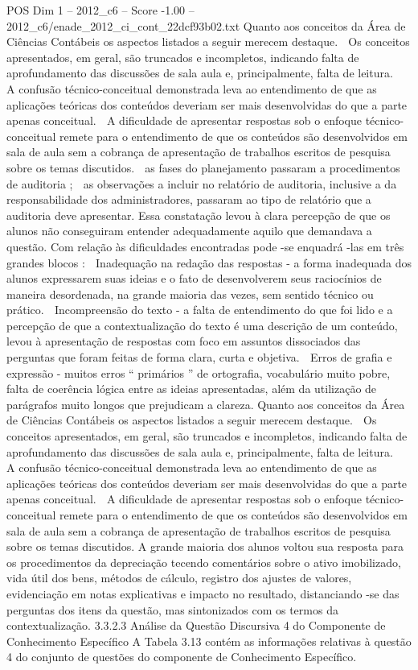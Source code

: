 \begin{textsample}{POS Dim 1 – 2012\_c6 – Score -1.00 – 2012\_c6/enade\_2012\_ci\_cont\_22dcf93b02.txt}
Quanto aos conceitos da Área de Ciências Contábeis os aspectos listados a seguir merecem destaque.  Os conceitos apresentados, em geral, são truncados e incompletos, indicando falta de aprofundamento das discussões de sala aula e, principalmente, falta de leitura.  A confusão técnico-conceitual demonstrada leva ao entendimento de que as aplicações teóricas dos conteúdos deveriam ser mais desenvolvidas do que a parte apenas conceitual.  A dificuldade de apresentar respostas sob o enfoque técnico-conceitual remete para o entendimento de que os conteúdos são desenvolvidos em sala de aula sem a cobrança de apresentação de trabalhos escritos de pesquisa sobre os temas discutidos.  as fases do planejamento passaram a procedimentos de auditoria ;  as observações a incluir no relatório de auditoria, inclusive a da responsabilidade dos administradores, passaram ao tipo de relatório que a auditoria deve apresentar.
Essa constatação levou à clara percepção de que os alunos não conseguiram entender adequadamente aquilo que demandava a questão.
Com relação às dificuldades encontradas pode -se enquadrá -las em três grandes blocos :  Inadequação na redação das respostas - a forma inadequada dos alunos expressarem suas ideias e o fato de desenvolverem seus raciocínios de maneira desordenada, na grande maioria das vezes, sem sentido técnico ou prático.  Incompreensão do texto - a falta de entendimento do que foi lido e a percepção de que a contextualização do texto é uma descrição de um conteúdo, levou à apresentação de respostas com foco em assuntos dissociados das perguntas que foram feitas de forma clara, curta e objetiva.  Erros de grafia e expressão - muitos erros “ primários ” de ortografia, vocabulário muito pobre, falta de coerência lógica entre as ideias apresentadas, além da utilização de parágrafos muito longos que prejudicam a clareza.
Quanto aos conceitos da Área de Ciências Contábeis os aspectos listados a seguir merecem destaque.  Os conceitos apresentados, em geral, são truncados e incompletos, indicando falta de aprofundamento das discussões de sala aula e, principalmente, falta de leitura.  A confusão técnico-conceitual demonstrada leva ao entendimento de que as aplicações teóricas dos conteúdos deveriam ser mais desenvolvidas do que a parte apenas conceitual.  A dificuldade de apresentar respostas sob o enfoque técnico-conceitual remete para o entendimento de que os conteúdos são desenvolvidos em sala de aula sem a cobrança de apresentação de trabalhos escritos de pesquisa sobre os temas discutidos.
A grande maioria dos alunos voltou sua resposta para os procedimentos da depreciação tecendo comentários sobre o ativo imobilizado, vida útil dos bens, métodos de cálculo, registro dos ajustes de valores, evidenciação em notas explicativas e impacto no resultado, distanciando -se das perguntas dos itens da questão, mas sintonizados com os termos da contextualização. 3.3.2.3 Análise da Questão Discursiva 4 do Componente de Conhecimento Específico A Tabela 3.13 contém as informações relativas à questão 4 do conjunto de questões do componente de Conhecimento Específico.

\end{textsample}
